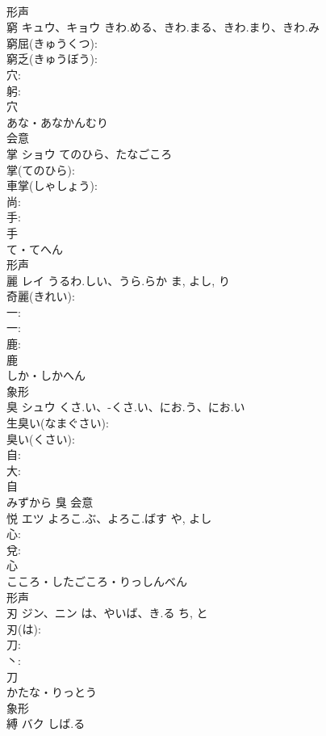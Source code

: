 \documentclass[8pt]{extreport}
\begin{document}
\begin{CJK}{UTF8}{min}
\\	形声 
\\	窮	キュウ、キョウ	きわ.める、きわ.まる、きわ.まり、きわ.み		
\\	窮屈(きゅうくつ): 
\\	窮乏(きゅうぼう): 
\\	穴: 
\\	躬: 
\\	穴	
\\	あな・あなかんむり	
\\	会意 
\\	掌	ショウ	てのひら、たなごころ		
\\	掌(てのひら): 
\\	車掌(しゃしょう): 
\\	尚: 
\\	手: 
\\	手	
\\	て・てへん	
\\	形声 
\\	麗	レイ	うるわ.しい、うら.らか	ま, よし, り	
\\	奇麗(きれい): 
\\	一: 
\\	一: 
\\	鹿: 
\\	鹿	
\\	しか・しかへん	
\\	象形 
\\	臭	シュウ	くさ.い、-くさ.い、にお.う、にお.い		
\\	生臭い(なまぐさい): 
\\	臭い(くさい): 
\\	自: 
\\	大: 
\\	自	
\\	みずから	臭	会意 
\\	悦	エツ	よろこ.ぶ、よろこ.ばす	や, よし	
\\	心: 
\\	兌: 
\\	心	
\\	こころ・したごころ・りっしんべん	
\\	形声 
\\	刃	ジン、ニン	は、やいば、き.る	ち, と	
\\	刃(は): 
\\	刀: 
\\	丶: 
\\	刀	
\\	かたな・りっとう	
\\	象形 
\\	縛	バク	しば.る		

\end{CJK}
\end{document}

